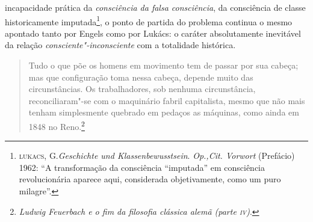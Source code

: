 incapacidade prática da \emph{consciência da falsa consciência}, da
consciência de classe historicamente imputada\footnote{\textsc{lukacs},
  G.\emph{Geschichte und Klassenbewusstsein}. \emph{Op.,Cit. Vorwort}
  (Prefácio) 1962: ``A transformação da consciência ``imputada'' em
  consciência revolucionária aparece aqui, considerada objetivamente,
  como um puro milagre''.}, o ponto de partida do problema continua o
mesmo apontado tanto por Engels como por Lukács: o caráter absolutamente
inevitável da relação \emph{consciente"-inconsciente} com a totalidade
histórica.

\begin{quote}
Tudo o que põe os homens em movimento tem de passar por sua cabeça; mas
que configuração toma nessa cabeça, depende muito das circunstâncias. Os
trabalhadores, sob nenhuma circunstância, reconciliaram"-se com o
maquinário fabril capitalista, mesmo que não mais tenham simplesmente
quebrado em pedaços as máquinas, como ainda em 1848 no Reno.\footnote{\emph{Ludwig Feuerbach e o fim da filosofia clássica alemã (parte \textsc{iv})}.}
\end{quote}


